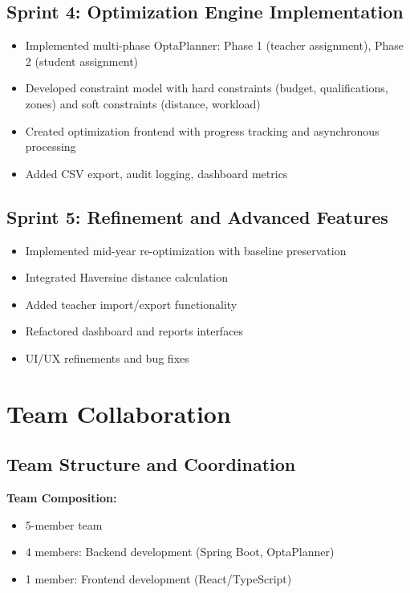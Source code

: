 \documentclass[12pt,a4paper]{report}
\begin{document}
\subsection{Sprint 4: Optimization Engine Implementation}
\begin{itemize}
    \item Implemented multi-phase OptaPlanner: Phase 1 (teacher assignment), Phase 2 (student assignment)
    \item Developed constraint model with hard constraints (budget, qualifications, zones) and soft constraints (distance, workload)
    \item Created optimization frontend with progress tracking and asynchronous processing
    \item Added CSV export, audit logging, dashboard metrics
\end{itemize}

\subsection{Sprint 5: Refinement and Advanced Features}
\begin{itemize}
    \item Implemented mid-year re-optimization with baseline preservation
    \item Integrated Haversine distance calculation
    \item Added teacher import/export functionality
    \item Refactored dashboard and reports interfaces
    \item UI/UX refinements and bug fixes
\end{itemize}

\section{Team Collaboration}

\subsection{Team Structure and Coordination}

\textbf{Team Composition:}
\begin{itemize}
    \item 5-member team
    \item 4 members: Backend development (Spring Boot, OptaPlanner)
    \item 1 member: Frontend development (React/TypeScript)
\end{itemize}
\end{document}
